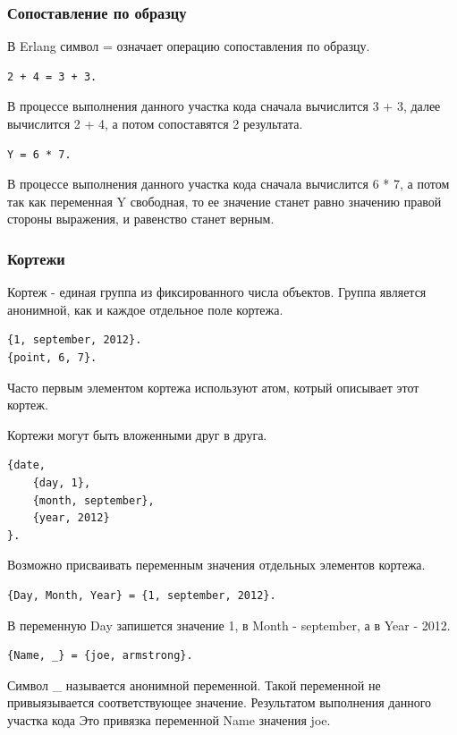 \subsubsection{Сопоставление по образцу}
В Erlang символ = означает операцию сопоставления по
образцу.
\begin{lstlisting}
2 + 4 = 3 + 3.
\end{lstlisting}
В процессе выполнения данного участка кода сначала вычислится 
3 + 3, далее вычислится 2 + 4, а потом сопоставятся 2 результата.
\begin{lstlisting}
Y = 6 * 7.
\end{lstlisting}
В процессе выполнения данного участка кода сначала вычислится
6 * 7, а потом так как переменная Y свободная, то ее значение станет 
равно значению правой стороны выражения, и равенство станет верным.


\subsubsection{Кортежи}
Кортеж - единая группа из фиксированного числа объектов. Группа является 
анонимной, как и каждое отдельное поле кортежа.
\begin{lstlisting}
{1, september, 2012}.
{point, 6, 7}.
\end{lstlisting}
Часто первым элементом кортежа используют атом, котрый описывает этот кортеж.

Кортежи могут быть вложенными друг в друга.
\begin{lstlisting}
{date,
	{day, 1},
	{month, september},
	{year, 2012}
}.
\end{lstlisting}

Возможно присваивать переменным значения отдельных элементов кортежа.
\begin{lstlisting}
{Day, Month, Year} = {1, september, 2012}.
\end{lstlisting}
В переменную Day запишется значение 1, в Month - september, а в Year - 2012.

\begin{lstlisting}
{Name, _} = {joe, armstrong}.
\end{lstlisting}
Символ \_ называется анонимной переменной. Такой переменной не привыязывается 
соответствующее значение. Результатом выполнения данного участка кода Это привязка
переменной Name значения joe.


